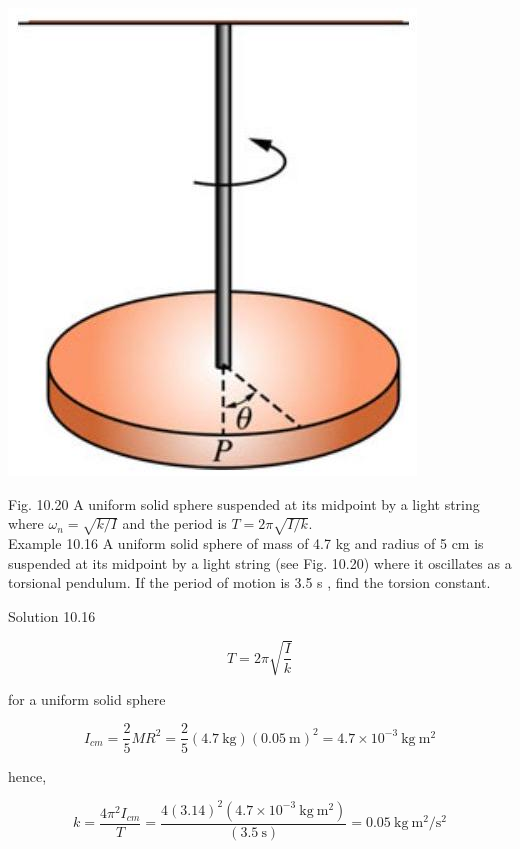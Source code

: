 \documentclass[10pt]{article}
\begin{document}
\begin{center}
\includegraphics[max width=\textwidth]{2024_09_13_db1f357d2aad0a03eb2eg-172}
\end{center}

Fig. 10.20 A uniform solid sphere suspended at its midpoint by a light string\\
where $\omega_{n}=\sqrt{k / I}$ and the period is $T=2 \pi \sqrt{I / k}$.\\
Example 10.16 A uniform solid sphere of mass of 4.7 kg and radius of 5 cm is suspended at its midpoint by a light string (see Fig. 10.20) where it oscillates as a torsional pendulum. If the period of motion is 3.5 s , find the torsion constant.

Solution 10.16

$$
T=2 \pi \sqrt{\frac{I}{k}}
$$

for a uniform solid sphere

$$
I_{c m}=\frac{2}{5} M R^{2}=\frac{2}{5}(4.7 \mathrm{~kg})(0.05 \mathrm{~m})^{2}=4.7 \times 10^{-3} \mathrm{~kg} \mathrm{~m}^{2}
$$

hence,

$$
k=\frac{4 \pi^{2} I_{c m}}{T}=\frac{4(3.14)^{2}\left(4.7 \times 10^{-3} \mathrm{~kg} \mathrm{~m}^{2}\right)}{(3.5 \mathrm{~s})}=0.05 \mathrm{~kg} \mathrm{~m}^{2} / \mathrm{s}^{2}
$$
\end{document}
